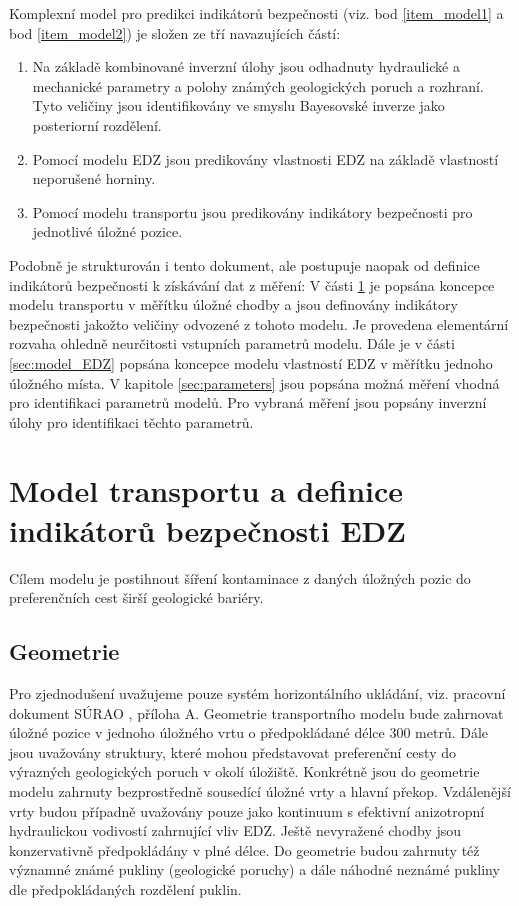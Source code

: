 \documentclass{article}
\begin{document}
Komplexní model pro predikci indikátorů bezpečnosti (viz. bod \ref{item_model1} a bod \ref{item_model2}) je složen ze tří navazujících částí: 
    \begin{enumerate}
    \item Na základě kombinované inverzní úlohy jsou odhadnuty hydraulické a mechanické
     parametry  a polohy známých geologických poruch a rozhraní. Tyto veličiny jsou identifikovány ve smyslu Bayesovské inverze jako posteriorní rozdělení.
    \item Pomocí modelu EDZ jsou predikovány vlastnosti EDZ na základě vlastností neporušené horniny.
    \item Pomocí modelu transportu jsou predikovány indikátory bezpečnosti pro jednotlivé úložné pozice.
    \end{enumerate}
Podobně je strukturován i tento dokument, ale postupuje naopak od definice indikátorů bezpečnosti k získávání dat z měření: V části \ref{sec:transport} je popsána koncepce modelu transportu v měřítku úložné chodby a jsou definovány indikátory bezpečnosti jakožto veličiny odvozené z tohoto modelu. Je provedena elementární rozvaha ohledně neurčitosti vstupních parametrů modelu. Dále je v části
\ref{sec:model_EDZ} popsána koncepce modelu vlastností EDZ v měřítku jednoho úložného místa. 
V kapitole \ref{sec:parameters} jsou popsána možná měření vhodná pro identifikaci 
parametrů modelů. Pro vybraná měření jsou popsány inverzní úlohy pro identifikaci těchto parametrů.


\section{Model transportu a definice indikátorů bezpečnosti EDZ}
\label{sec:transport}
Cílem modelu je postihnout šíření kontaminace z daných úložných pozic do preferenčních cest širší geologické bariéry.
\subsection{Geometrie}
 Pro zjednodušení uvažujeme pouze systém horizontálního ukládání, viz.  pracovní dokument SÚRAO , příloha A. Geometrie transportního modelu bude zahrnovat úložné pozice v jednoho úložného vrtu o předpokládané délce 300 metrů. Dále jsou uvažovány  struktury, které mohou představovat preferenční cesty do výrazných geologických poruch v okolí úložiště. Konkrétně jsou do geometrie modelu zahrnuty bezprostředně sousedící úložné vrty a hlavní překop. Vzdálenější vrty budou případně uvažovány pouze jako kontinuum s efektivní anizotropní hydraulickou vodivostí zahrnující vliv EDZ. 
Ještě nevyražené chodby jsou konzervativně předpokládány v plné délce. Do geometrie budou zahrnuty též významné známé pukliny (geologické poruchy) a dále náhodné neznámé pukliny dle předpokládaných rozdělení puklin.
\end{document}
